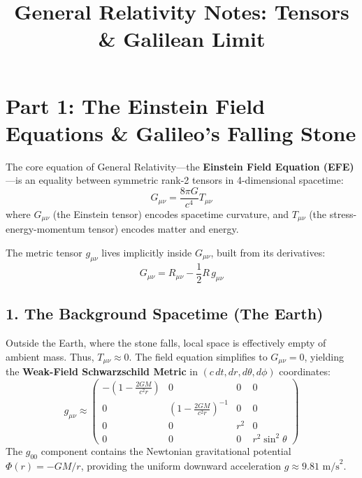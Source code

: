 \documentclass{article}
\title{General Relativity Notes: Tensors \& Galilean Limit}
\date{}
\begin{document}
	
	\maketitle
	
	\section*{Part 1: The Einstein Field Equations \& Galileo's Falling Stone}
	
	The core equation of General Relativity—the \textbf{Einstein Field Equation (EFE)}—is an equality between symmetric rank-2 tensors in 4-dimensional spacetime:
	\begin{equation}
		G_{\mu\nu} = \frac{8\pi G}{c^4} T_{\mu\nu}
	\end{equation}
	where $G_{\mu\nu}$ (the Einstein tensor) encodes spacetime curvature, and $T_{\mu\nu}$ (the stress-energy-momentum tensor) encodes matter and energy.
	
	The metric tensor $g_{\mu\nu}$ lives implicitly inside $G_{\mu\nu}$, built from its derivatives:
	\begin{equation}
		G_{\mu\nu} = R_{\mu\nu} - \frac{1}{2} R \, g_{\mu\nu}
	\end{equation}
	
	\subsection*{1. The Background Spacetime (The Earth)}
	Outside the Earth, where the stone falls, local space is effectively empty of ambient mass. Thus, $T_{\mu\nu} \approx 0$. The field equation simplifies to $G_{\mu\nu} = 0$, yielding the \textbf{Weak-Field Schwarzschild Metric} in $(c\,dt, dr, d\theta, d\phi)$ coordinates:
	\begin{equation}
		g_{\mu\nu} \approx \begin{pmatrix} 
			-\left(1 - \frac{2GM}{c^2 r}\right) & 0 & 0 & 0 \\
			0 & \left(1 - \frac{2GM}{c^2 r}\right)^{-1} & 0 & 0 \\
			0 & 0 & r^2 & 0 \\
			0 & 0 & 0 & r^2 \sin^2\theta
		\end{pmatrix}
	\end{equation}
	The $g_{00}$ component contains the Newtonian gravitational potential $\Phi(r) = -GM/r$, providing the uniform downward acceleration $g \approx 9.81 \text{ m/s}^2$.
	
\end{document}
